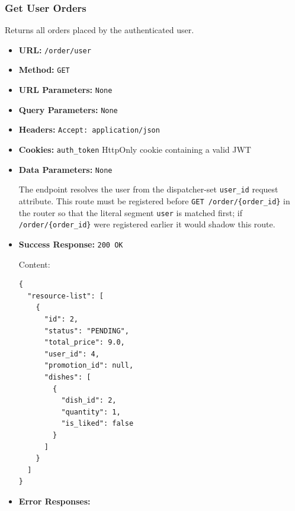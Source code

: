 \subsubsection*{Get User Orders}

Returns all orders placed by the authenticated user.

\begin{itemize}[nosep]
\item \textbf{URL:} \texttt{/order/user}

\item \textbf{Method:} \texttt{GET}

\item \textbf{URL Parameters:} \texttt{None}

\item \textbf{Query Parameters:} \texttt{None}

\item \textbf{Headers:} \texttt{Accept: application/json}

\item \textbf{Cookies:} \texttt{auth\_token} HttpOnly cookie containing a valid JWT

\item \textbf{Data Parameters:} \texttt{None}

The endpoint resolves the user from the dispatcher-set \texttt{user\_id} request attribute. This route must be registered before \texttt{GET /order/\{order\_id\}} in the router so that the literal segment \texttt{user} is matched first; if \texttt{/order/\{order\_id\}} were registered earlier it would shadow this route.

\item \textbf{Success Response:} \texttt{200 OK}

Content:

\begin{lstlisting}
{
  "resource-list": [
    {
      "id": 2,
      "status": "PENDING",
      "total_price": 9.0,
      "user_id": 4,
      "promotion_id": null,
      "dishes": [
        {
          "dish_id": 2,
          "quantity": 1,
          "is_liked": false
        }
      ]
    }
  ]
}
\end{lstlisting}

\item \textbf{Error Responses:}


\end{itemize}
